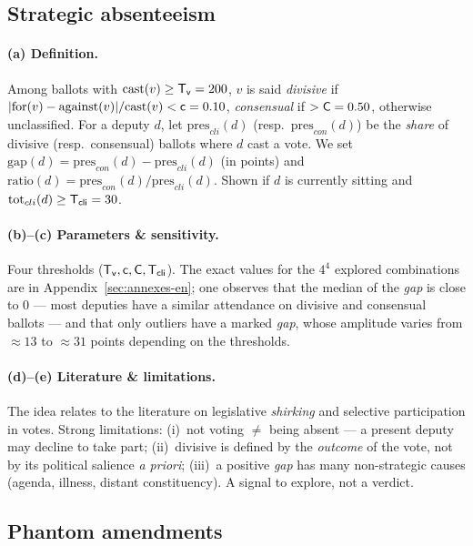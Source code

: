 \subsection{Strategic absenteeism}\label{sec:absence-en}

\paragraph{(a) Definition.} Among ballots with $\text{cast}(v)\ge \mathsf{T_v}=200$,
$v$ is said \emph{divisive} if $|\mathrm{for}(v)-\mathrm{against}(v)|/\text{cast}(v)<\mathsf{c}=0.10$,
\emph{consensual} if $>\mathsf{C}=0.50$, otherwise unclassified. For a deputy $d$,
let $\mathrm{pres}_{cli}(d)$ (resp.\ $\mathrm{pres}_{con}(d)$) be the \emph{share}
of divisive (resp.\ consensual) ballots where $d$ cast a vote. We set
$\mathrm{gap}(d)=\mathrm{pres}_{con}(d)-\mathrm{pres}_{cli}(d)$ (in points) and
$\mathrm{ratio}(d)=\mathrm{pres}_{con}(d)/\mathrm{pres}_{cli}(d)$. Shown if $d$ is
currently sitting and $\mathrm{tot}_{cli}(d)\ge \mathsf{T_{cli}}=30$.

\paragraph{(b)--(c) Parameters \& sensitivity.} Four thresholds
($\mathsf{T_v},\mathsf{c},\mathsf{C},\mathsf{T_{cli}}$). The exact values for the
$4^4$ explored combinations are in Appendix~\ref{sec:annexes-en}; one observes that
the median of the \emph{gap} is close to $0$ — most deputies have a similar
attendance on divisive and consensual ballots — and that only outliers have a
marked \emph{gap}, whose amplitude varies from $\approx 13$ to $\approx 31$ points
depending on the thresholds.

\paragraph{(d)--(e) Literature \& limitations.} The idea relates to the literature
on legislative \emph{shirking} and selective participation in votes. Strong
limitations: (i)~not voting $\ne$ being absent — a present deputy may decline to
take part; (ii)~\og{}divisive\fg{} is defined by the \emph{outcome} of the vote,
not by its political salience \emph{a priori}; (iii)~a positive \emph{gap} has many
non-strategic causes (agenda, illness, distant constituency). A signal to explore,
not a verdict.

\subsection{\og{}Phantom\fg{} amendments}\label{sec:fantomes-en}

